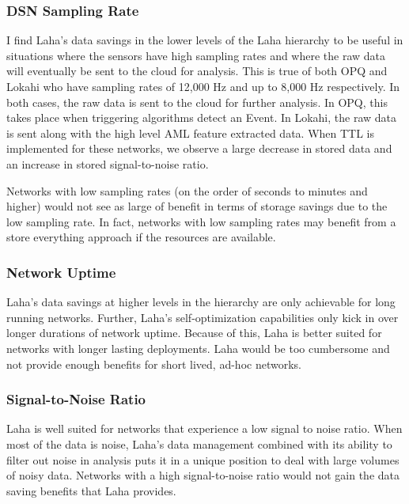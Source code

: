 \subsubsection{DSN Sampling Rate}
I find Laha's data savings in the lower levels of the Laha hierarchy to be useful in situations where the sensors have high sampling rates and where the raw data will eventually be sent to the cloud for analysis. This is true of both OPQ and Lokahi who have sampling rates of 12,000 Hz and up to 8,000 Hz respectively. In both cases, the raw data is sent to the cloud for further analysis. In OPQ, this takes place when triggering algorithms detect an Event. In Lokahi, the raw data is sent along with the high level AML feature extracted data. When TTL is implemented for these networks, we observe a large decrease in stored data and an increase in stored signal-to-noise ratio.

Networks with low sampling rates (on the order of seconds to minutes and higher) would not see as large of benefit in terms of storage savings due to the low sampling rate. In fact, networks with low sampling rates may benefit from a store everything approach if the resources are available.

\subsubsection{Network Uptime}
Laha's data savings at higher levels in the hierarchy are only achievable for long running networks. Further, Laha's self-optimization capabilities only kick in over longer durations of network uptime. Because of this, Laha is better suited for networks with longer lasting deployments. Laha would be too cumbersome and not provide enough benefits for short lived, ad-hoc networks.

\subsubsection{Signal-to-Noise Ratio}
Laha is well suited for networks that experience a low signal to noise ratio. When most of the data is noise, Laha's data management combined with its ability to filter out noise in analysis puts it in a unique position to deal with large volumes of noisy data. Networks with a high signal-to-noise ratio would not gain the data saving benefits that Laha provides.

